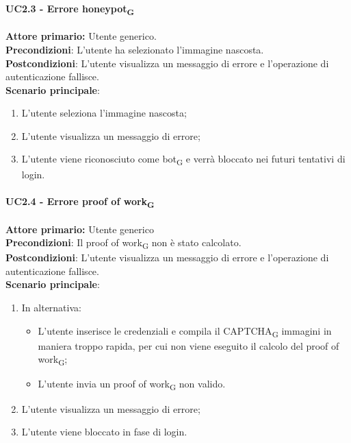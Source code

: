 \paragraph{UC2.3 - Errore honeypot\textsubscript{G}}
\textbf{Attore primario:} Utente generico.\\
\textbf{Precondizioni}: L’utente ha selezionato l'immagine nascosta.\\
\textbf{Postcondizioni}: L’utente visualizza un messaggio di errore e l’operazione di autenticazione fallisce.\\

\textbf{Scenario principale}:
\begin{enumerate}
    \item L'utente seleziona l'immagine nascosta;
	\item L’utente visualizza un messaggio di errore;
	\item L'utente viene riconosciuto come bot\textsubscript{G} e verrà bloccato nei futuri tentativi di login.
\end{enumerate}

\paragraph{UC2.4 - Errore proof of work\textsubscript{G}}
\textbf{Attore primario:} Utente generico\\
\textbf{Precondizioni}: Il proof of work\textsubscript{G} non è stato calcolato.\\
\textbf{Postcondizioni}:  L’utente visualizza un messaggio di errore e l’operazione di autenticazione fallisce.\\

\textbf{Scenario principale}:
\begin{enumerate}
    \item In alternativa:
    \begin{itemize}
        \item L'utente inserisce le credenziali e compila il CAPTCHA\textsubscript{G} immagini in maniera troppo rapida, per cui non viene eseguito il calcolo del proof of work\textsubscript{G};
        \item L'utente invia un proof of work\textsubscript{G} non valido.
    \end{itemize}
	\item L’utente visualizza un messaggio di errore;
	\item L'utente viene bloccato in fase di login.
\end{enumerate}

